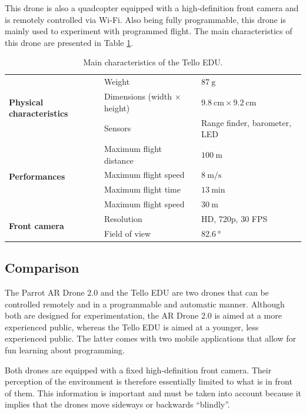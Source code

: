This drone is also a quadcopter equipped with a high-definition front camera and is remotely controlled via Wi-Fi. Also being fully programmable, this drone is mainly used to experiment with programmed flight. The main characteristics of this drone are presented in Table \ref{tab:04.tello.edu.characteristics}.

\begin{table}[H]
    \centering
    \begin{tabular}{|l|l|p{4cm}|}
        \hline
        \multirow{3}{*}{\textbf{Physical characteristics}} & Weight & $\SI{87}{\gram}$ \\ \cline{2-3}
        & Dimensions (width $\times$ height) & $\SI{9.8}{\centi\meter} \times \SI{9.2}{\centi\meter}$ \\ \cline{2-3}
        & Sensors & Range finder, barometer, LED \\ \hline
        \hline
        \multirow{4}{*}{\textbf{Performances}} & Maximum flight distance & $\SI{100}{\meter}$ \\ \cline{2-3}
        & Maximum flight speed & $\SI{8}{\meter\per\second}$ \\ \cline{2-3}
        & Maximum flight time & $\SI{13}{\minute}$ \\ \cline{2-3}
        & Maximum flight speed & $\SI{30}{\meter}$ \\ \hline
        \hline
        \multirow{2}{*}{\textbf{Front camera}} & Resolution & HD, 720p, 30 FPS \\ \cline{2-3}
        & Field of view & $\SI{82.6}{\degree}$ \\ \hline
    \end{tabular}
    \caption{Main characteristics of the Tello EDU. \cite{ryzerobotics2021telloedu}}
    \label{tab:04.tello.edu.characteristics}
\end{table}

\subsection{Comparison}

The Parrot AR Drone 2.0 and the Tello EDU are two drones that can be controlled remotely and in a programmable and automatic manner. Although both are designed for experimentation, the AR Drone 2.0 is aimed at a more experienced public, whereas the Tello EDU is aimed at a younger, less experienced public. The latter comes with two mobile applications that allow for fun learning about programming.

Both drones are equipped with a fixed high-definition front camera. Their perception of the environment is therefore essentially limited to what is in front of them. This information is important and must be taken into account because it implies that the drones move sideways or backwards \enquote{blindly}.

